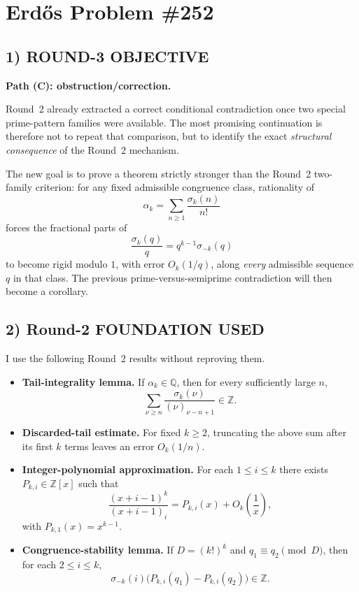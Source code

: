 \section{Erd\H{o}s Problem \#252}

\subsection*{1) ROUND-3 OBJECTIVE}
\textbf{Path (C): obstruction/correction.}

Round~2 already extracted a correct conditional contradiction once two special prime-pattern families were available. The most promising continuation is therefore not to repeat that comparison, but to identify the exact \emph{structural consequence} of the Round~2 mechanism.

The new goal is to prove a theorem strictly stronger than the Round~2 two-family criterion: for any fixed admissible congruence class, rationality of
\[
\alpha_k=\sum_{n\ge 1}\frac{\sigma_k(n)}{n!}
\]
forces the fractional parts of
\[
\frac{\sigma_k(q)}{q}=q^{k-1}\sigma_{-k}(q)
\]
to become rigid modulo $1$, with error $O_k(1/q)$, along \emph{every} admissible sequence $q$ in that class. The previous prime-versus-semiprime contradiction will then become a corollary.

\subsection*{2) Round-2 FOUNDATION USED}
I use the following Round~2 results without reproving them.
\begin{itemize}
\item \textbf{Tail-integrality lemma.} If $\alpha_k\in\mathbb{Q}$, then for every sufficiently large $n$,
\[
\sum_{\nu\ge n}\frac{\sigma_k(\nu)}{(\nu)_{\nu-n+1}}\in\mathbb{Z}.
\]
\item \textbf{Discarded-tail estimate.} For fixed $k\ge 2$, truncating the above sum after its first $k$ terms leaves an error $O_k(1/n)$.
\item \textbf{Integer-polynomial approximation.} For each $1\le i\le k$ there exists $P_{k,i}\in\mathbb{Z}[x]$ such that
\[
\frac{(x+i-1)^k}{(x+i-1)_i}=P_{k,i}(x)+O_k\!\left(\frac1x\right),
\]
with $P_{k,1}(x)=x^{k-1}$.
\item \textbf{Congruence-stability lemma.} If $D=(k!)^k$ and $q_1\equiv q_2\pmod D$, then for each $2\le i\le k$,
\[
\sigma_{-k}(i)\bigl(P_{k,i}(q_1)-P_{k,i}(q_2)\bigr)\in\mathbb{Z}.
\]
\end{itemize}

